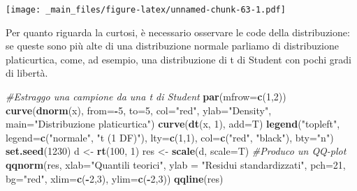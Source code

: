 \documentclass[a4paper,12pt,oneside]{book}
\newenvironment{Shaded}{\begin{snugshade}}{\end{snugshade}}
\newcommand{\KeywordTok}[1]{\textcolor[rgb]{0.13,0.29,0.53}{\textbf{#1}}}
\newcommand{\DataTypeTok}[1]{\textcolor[rgb]{0.13,0.29,0.53}{#1}}
\newcommand{\DecValTok}[1]{\textcolor[rgb]{0.00,0.00,0.81}{#1}}
\newcommand{\StringTok}[1]{\textcolor[rgb]{0.31,0.60,0.02}{#1}}
\newcommand{\CommentTok}[1]{\textcolor[rgb]{0.56,0.35,0.01}{\textit{#1}}}
\newcommand{\OperatorTok}[1]{\textcolor[rgb]{0.81,0.36,0.00}{\textbf{#1}}}
\newcommand{\NormalTok}[1]{#1}
\theoremstyle{definition}
\theoremstyle{definition}
\theoremstyle{definition}
\theoremstyle{remark}
\begin{document}
\texttt{[image: \_main\_files/figure-latex/unnamed-chunk-63-1.pdf]}

Per quanto riguarda la curtosi, è necessario osservare le code della
distribuzione: se queste sono più alte di una distribuzione normale
parliamo di distribuzione platicurtica, come, ad esempio, una
distribuzione di t di Student con pochi gradi di libertà.

\begin{Shaded}
\begin{Highlighting}[]
\CommentTok{#Estraggo una campione da una t di Student}
\KeywordTok{par}\NormalTok{(}\DataTypeTok{mfrow=}\KeywordTok{c}\NormalTok{(}\DecValTok{1}\NormalTok{,}\DecValTok{2}\NormalTok{))}
\KeywordTok{curve}\NormalTok{(}\KeywordTok{dnorm}\NormalTok{(x), }\DataTypeTok{from=}\OperatorTok{-}\DecValTok{5}\NormalTok{, }\DataTypeTok{to=}\DecValTok{5}\NormalTok{, }\DataTypeTok{col=}\StringTok{"red"}\NormalTok{, }
      \DataTypeTok{ylab=}\StringTok{"Density"}\NormalTok{, }\DataTypeTok{main=}\StringTok{"Distribuzione platicurtica"}\NormalTok{)}
\KeywordTok{curve}\NormalTok{(}\KeywordTok{dt}\NormalTok{(x, }\DecValTok{1}\NormalTok{), }\DataTypeTok{add=}\NormalTok{T)}
\KeywordTok{legend}\NormalTok{(}\StringTok{"topleft"}\NormalTok{, }\DataTypeTok{legend=}\KeywordTok{c}\NormalTok{(}\StringTok{"normale"}\NormalTok{, }\StringTok{"t (1 DF)"}\NormalTok{),}
       \DataTypeTok{lty=}\KeywordTok{c}\NormalTok{(}\DecValTok{1}\NormalTok{,}\DecValTok{1}\NormalTok{), }\DataTypeTok{col=}\KeywordTok{c}\NormalTok{(}\StringTok{"red"}\NormalTok{, }\StringTok{"black"}\NormalTok{), }\DataTypeTok{bty=}\StringTok{"n"}\NormalTok{)}
\KeywordTok{set.seed}\NormalTok{(}\DecValTok{1230}\NormalTok{)}
\NormalTok{d <-}\StringTok{ }\KeywordTok{rt}\NormalTok{(}\DecValTok{100}\NormalTok{, }\DecValTok{1}\NormalTok{)}
\NormalTok{res <-}\StringTok{ }\KeywordTok{scale}\NormalTok{(d, }\DataTypeTok{scale=}\NormalTok{T)}
\CommentTok{#Produco un QQ-plot}
\KeywordTok{qqnorm}\NormalTok{(res, }\DataTypeTok{xlab=}\StringTok{"Quantili teorici"}\NormalTok{, }
     \DataTypeTok{ylab =} \StringTok{"Residui  standardizzati"}\NormalTok{,}
     \DataTypeTok{pch=}\DecValTok{21}\NormalTok{, }\DataTypeTok{bg=}\StringTok{"red"}\NormalTok{, }\DataTypeTok{xlim=}\KeywordTok{c}\NormalTok{(}\OperatorTok{-}\DecValTok{2}\NormalTok{,}\DecValTok{3}\NormalTok{), }\DataTypeTok{ylim=}\KeywordTok{c}\NormalTok{(}\OperatorTok{-}\DecValTok{2}\NormalTok{,}\DecValTok{3}\NormalTok{))}
\KeywordTok{qqline}\NormalTok{(res)}
\end{Highlighting}
\end{Shaded}
\end{document}

